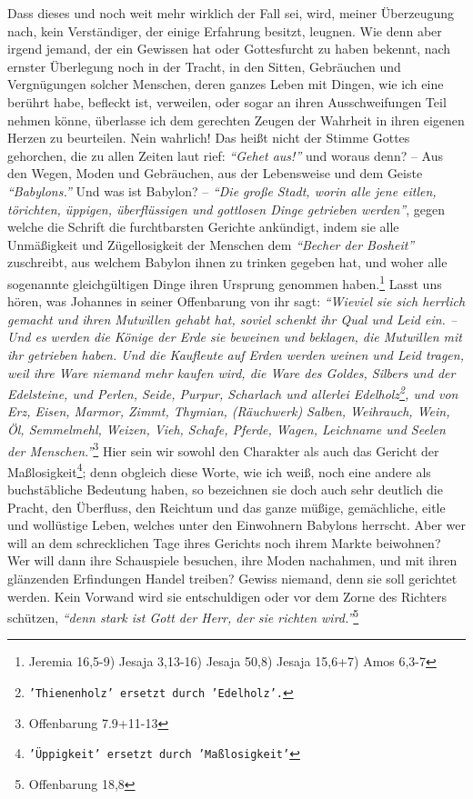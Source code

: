Dass dieses und noch weit mehr wirklich der Fall sei, wird, meiner Überzeugung
nach, kein Verständiger, der einige Erfahrung besitzt, leugnen. Wie denn aber
irgend jemand, der ein Gewissen hat oder Gottesfurcht zu haben bekennt, nach
ernster Überlegung noch in der Tracht, in den Sitten, Gebräuchen und
Vergnügungen solcher Menschen, deren ganzes Leben mit Dingen, wie ich eine
berührt habe, befleckt ist, verweilen, oder sogar an ihren Ausschweifungen Teil
nehmen könne, überlasse ich dem gerechten Zeugen der Wahrheit in ihren eigenen
Herzen zu beurteilen. Nein wahrlich! Das heißt nicht der Stimme Gottes
gehorchen, die zu allen Zeiten laut rief: \textit{"`Gehet aus!"'} und woraus
denn? -- Aus den Wegen, Moden und Gebräuchen, aus der Lebensweise und dem Geiste
\textit{"`Babylons."'} Und was ist Babylon? --
\textit{"`Die große Stadt, worin alle jene eitlen,
törichten, üppigen, überflüssigen und gottlosen Dinge getrieben werden"'},
gegen
welche die Schrift die furchtbarsten Gerichte ankündigt,
indem sie alle
Unmäßigkeit und Zügellosigkeit der Menschen dem \textit{"`Becher der Bosheit"'}
zuschreibt,
aus welchem Babylon ihnen zu trinken gegeben hat, und woher alle sogenannte
gleichgültigen Dinge ihren Ursprung genommen haben.\footnote{Jeremia 16,5-9)
Jesaja 3,13-16)
Jesaja 50,8)
Jesaja 15,6+7)
Amos 6,3-7}
Lasst uns hören, was Johannes in
seiner Offenbarung von ihr sagt:
\textit{"`Wieviel sie sich herrlich gemacht und ihren
Mutwillen gehabt hat, soviel schenkt ihr Qual und Leid ein. -- Und es werden die
Könige der Erde
sie beweinen und beklagen, die Mutwillen mit ihr getrieben
haben. Und die Kaufleute auf Erden werden weinen und Leid tragen, weil ihre
Ware niemand mehr kaufen wird, die Ware des Goldes, Silbers und der
Edelsteine, und Perlen, Seide, Purpur, Scharlach und allerlei
Edelholz\footnote{\texttt{'Thienenholz' ersetzt durch 'Edelholz'.}}, und von Erz,
Eisen, Marmor, Zimmt, Thymian,
(Räuchwerk) Salben, Weihrauch, Wein, Öl, Semmelmehl,
Weizen, Vieh, Schafe, Pferde, Wagen, Leichname und Seelen der
Menschen."'}\footnote{Offenbarung 7.9+11-13}
Hier sein wir sowohl den Charakter
als auch das Gericht der Maßlosigkeit\footnote{\texttt{'Üppigkeit' ersetzt durch
'Maßlosigkeit'}}; denn obgleich diese
Worte, wie ich weiß,
noch eine andere als buchstäbliche Bedeutung
haben, so
bezeichnen sie
doch auch
sehr deutlich die Pracht, den Überfluss, den Reichtum und das ganze müßige,
gemächliche, eitle und wollüstige Leben, welches unter den Einwohnern
Babylons
herrscht. Aber wer will an dem schrecklichen Tage ihres
Gerichts noch ihrem
Markte beiwohnen? Wer will dann ihre Schauspiele besuchen, ihre Moden nachahmen,
und mit ihren glänzenden Erfindungen Handel treiben? Gewiss niemand, denn sie
soll gerichtet werden. Kein Vorwand wird sie entschuldigen oder vor dem Zorne
des Richters schützen,
\textit{"`denn stark ist Gott der Herr, der sie richten
wird."'}\footnote{Offenbarung 18,8}

